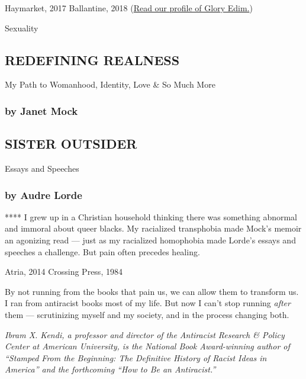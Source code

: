 Haymarket, 2017 \textbar{} Ballantine, 2018
(\href{https://www.nytimes.com/2018/10/25/books/well-read-black-girl-glory-edim.html}{Read
our profile of Glory Edim.})

Sexuality

\hypertarget{redefining-realness}{%
\subsection{REDEFINING REALNESS}\label{redefining-realness}}

My Path to Womanhood, Identity, Love \& So Much More

\hypertarget{by-janet-mock}{%
\subsubsection{\texorpdfstring{\textbf{by Janet
Mock}}{by Janet Mock}}\label{by-janet-mock}}

\hypertarget{sister-outsider}{%
\subsection{SISTER OUTSIDER}\label{sister-outsider}}

Essays and Speeches

\hypertarget{by-audre-lorde}{%
\subsubsection{\texorpdfstring{\textbf{by Audre
Lorde}}{by Audre Lorde}}\label{by-audre-lorde}}

**** I grew up in a Christian household thinking there was something
abnormal and immoral about queer blacks. My racialized transphobia made
Mock's memoir an agonizing read --- just as my racialized homophobia
made Lorde's essays and speeches a challenge. But pain often precedes
healing.

Atria, 2014 \textbar{} Crossing Press, 1984

By not running from the books that pain us, we can allow them to
transform us. I ran from antiracist books most of my life. But now I
can't stop running \emph{after} them --- scrutinizing myself and my
society, and in the process changing both.

\emph{Ibram X. Kendi, a professor and director of the Antiracist
Research \& Policy Center at American University, is the National Book
Award-winning author of ``Stamped From the Beginning: The Definitive
History of Racist Ideas in America'' and the forthcoming ``How to Be an
Antiracist.''}

